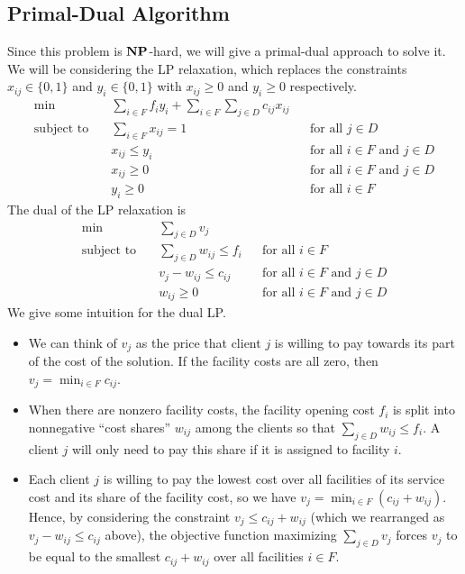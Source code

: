 \subsection{Primal-Dual Algorithm}
Since this problem is $\mathbf{NP}$-hard, we will give a primal-dual approach to solve it. 
We will be considering the LP relaxation, which replaces the constraints 
$x_{ij} \in \{0, 1\}$ and $y_i \in \{0, 1\}$ with $x_{ij} \geq 0$ and 
$y_i \geq 0$ respectively.
\begin{align*}
    \min\quad & \sum_{i\in F} f_i y_i + \sum_{i\in F} \sum_{j\in D} c_{ij} x_{ij} \\ 
    \text{subject to}\quad & \sum_{i\in F} x_{ij} = 1
    && \text{for all $j \in D$} \\
    & x_{ij} \leq y_i && \text{for all $i \in F$ and $j \in D$} \\
    & x_{ij} \geq 0 && \text{for all $i \in F$ and $j \in D$} \\ 
    & y_i \geq 0 && \text{for all $i \in F$}
\end{align*}
The dual of the LP relaxation is 
\begin{align*}
    \min\quad & \sum_{j\in D} v_j \\ 
    \text{subject to}\quad & \sum_{j\in D} w_{ij} \leq f_i
    && \text{for all $i \in F$} \\
    & v_j - w_{ij} \leq c_{ij} && \text{for all $i \in F$ and $j \in D$} \\
    & w_{ij} \geq 0 && \text{for all $i \in F$ and $j \in D$}
\end{align*}
We give some intuition for the dual LP. 
\begin{itemize} 
    \item We can think of $v_j$ as the price that client $j$ is willing to pay 
    towards its part of the cost of the solution. If the facility costs are all 
    zero, then $v_j = \min_{i\in F} c_{ij}$. 
    \item When there are nonzero facility costs, the facility opening cost $f_i$ 
    is split into nonnegative ``cost shares'' $w_{ij}$ among the clients so that 
    $\sum_{j\in D} w_{ij} \leq f_i$. A client $j$ will only need to pay this 
    share if it is assigned to facility $i$. 
    \item Each client $j$ is willing to pay the lowest cost over all facilities 
    of its service cost and its share of the facility cost, so we have 
    $v_j = \min_{i \in F} (c_{ij} + w_{ij})$. Hence, by considering the constraint 
    $v_j \leq c_{ij} + w_{ij}$ (which we rearranged as $v_j - w_{ij} \leq c_{ij}$ 
    above), the objective function maximizing $\sum_{j\in D} v_j$ forces 
    $v_j$ to be equal to the smallest $c_{ij} + w_{ij}$ over all facilities $i \in F$.
\end{itemize} 
